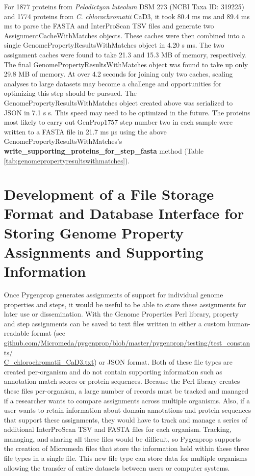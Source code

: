 For 1877 proteins from \textit{Pelodictyon luteolum} DSM 273 (NCBI Taxa ID: 319225) and 1774 proteins from \textit{C. chlorochromatii} CaD3, it took 80.4 ms  ms and 89.4 ms  ms to parse the FASTA and InterProScan TSV files and generate two AssignmentCacheWithMatches objects. These caches were then combined into a single GenomePropertyResultsWithMatches object in 4.20 s  ms. The two assignment caches were found to take 21.3 and 15.3 MB of memory, respectively. The final GenomePropertyResultsWithMatches object was found to take up only 29.8 MB of memory. At over 4.2 seconds for joining only two caches, scaling analyses to large datasets may become a challenge and opportunities for optimizing this step should be pursued. The GenomePropertyResultsWithMatches object created above was serialized to JSON in 7.1 s  s. This speed may need to be optimized in the future. The proteins most likely to carry out GenProp1757 step number two in each sample were written to a FASTA file in 21.7 ms  µs using the above GenomePropertyResultsWithMatches's \textbf{write\_supporting\_proteins\_for\_step\_fasta} method (Table \ref{tab:genomepropertyresultswithmatches}).

\section{Development of a File Storage Format and Database Interface for Storing Genome Property Assignments and Supporting Information} \label{MicromedaFiles}

Once Pygenprop generates assignments of support for individual genome properties and steps, it would be useful to be able to store these assignments for later use or dissemination. With the Genome Properties Perl library, property and step assignments can be saved to text files written in either a custom human-readable format (see \\ \href{github.com/Micromeda/pygenprop/blob/master/pygenprop/testing/test\_constants/C\_chlorochromatii\_CaD3.txt}{github.com/Micromeda/pygenprop/blob/master/pygenprop/testing/test\_constants/ \\ C\_chlorochromatii\_CaD3.txt}) or JSON format. Both of these file types are created per-organism and do not contain supporting information such as annotation match scores or protein sequences. Because the Perl library creates these files per-organism, a large number of records must be tracked and managed if a researcher wants to compare assignments across multiple organisms. Also, if a user wants to retain information about domain annotations and protein sequences that support these assignments, they would have to track and manage a series of additional InterProScan TSV and FASTA files for each organism. Tracking, managing, and sharing all these files would be difficult, so Pygenprop supports the creation of Micromeda files that store the information held within these three file types in a single file. This new file type can store data for multiple organisms allowing the transfer of entire datasets between users or computer systems.

